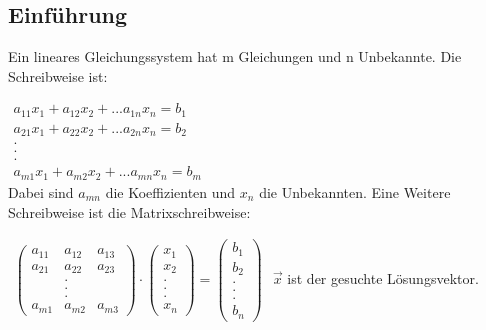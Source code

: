 \documentclass[a4paper,10pt]{scrartcl}
\begin{document}
        \subsection{Einführung}
        Ein lineares Gleichungssystem hat m Gleichungen und n Unbekannte. Die Schreibweise ist:
        
        $\begin{array}{c}
            a_{11}x_1 + a_{12}x_2 + ... a_{1n}x_n = b_1 \\
            a_{21}x_1 + a_{22}x_2 + ... a_{2n}x_n = b_2 \\
                        . \\ . \\ . \\
            a_{m1}x_1 + a_{m2}x_2 + ... a_{mn}x_n = b_m
        \end{array}$
        \\Dabei sind $a_{mn}$ die Koeffizienten und $x_n$ die Unbekannten. Eine Weitere Schreibweise ist die Matrixschreibweise: 
        
        $\begin{array}{c}
            \begin{pmatrix}
                a_{11} & a_{12} & a_{13}\\
                a_{21} & a_{22} & a_{23} \\
                 & . &  \\
                 & . & \\
                 & . & \\ 
                a_{m1} & a_{m2} & a_{m3}
                \end{pmatrix}
                \cdot
            \begin{pmatrix}
                x_1 \\
                x_2 \\
                . \\
                .\\
                .\\
                x_n
            \end{pmatrix}
                =
            \begin{pmatrix}
                b_1 \\
                b_2 \\
                . \\
                .\\
                .\\
                b_n
            \end{pmatrix}
        \end{array}$ 
        $\vec{x}$ ist der gesuchte Lösungsvektor.
\end{document}
